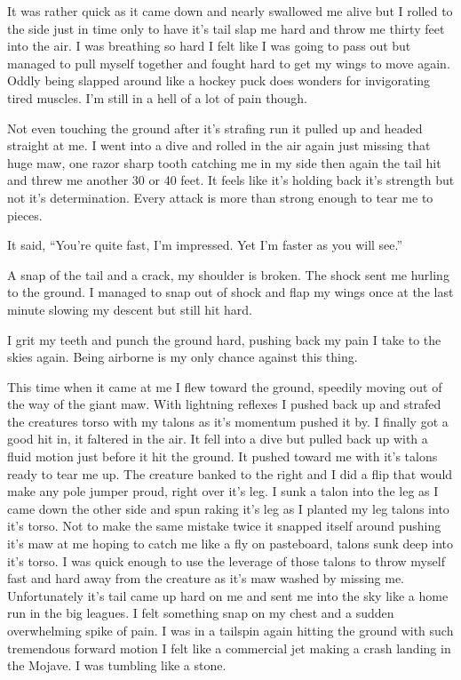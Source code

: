 \parasep{}

It was rather quick as it came down and nearly swallowed me alive but I rolled to the side just in time only to have it's tail slap me hard and throw me thirty feet into the air. I was breathing so hard I felt like I was going to pass out but managed to pull myself together and fought hard to get my wings to move again. Oddly being slapped around like a hockey puck does wonders for invigorating tired muscles. I'm still in a hell of a lot of pain though.

Not even touching the ground after it's strafing run it pulled up and headed straight at me. I went into a dive and rolled in the air again just missing that huge maw, one razor sharp tooth catching me in my side then again the tail hit and threw me another 30 or 40 feet. It feels like it's holding back it's strength but not it's determination. Every attack is more than strong enough to tear me to pieces.

It said, ``You're quite fast, I'm impressed. Yet I'm faster as you will see.''

A snap of the tail and a crack, my shoulder is broken. The shock sent me hurling to the ground. I managed to snap out of shock and flap my wings once at the last minute slowing my descent but still hit hard.

I grit my teeth and punch the ground hard, pushing back my pain I take to the skies again. Being airborne is my only chance against this thing.

This time when it came at me I flew toward the ground, speedily moving out of the way of the giant maw. With lightning reflexes I pushed back up and strafed the creatures torso with my talons as it's momentum pushed it by. I finally got a good hit in, it faltered in the air. It fell into a dive but pulled back up with a fluid motion just before it hit the ground. It pushed toward me with it's talons ready to tear me up. The creature banked to the right and I did a flip that would make any pole jumper proud, right over it's leg. I sunk a talon into the leg as I came down the other side and spun raking it's leg as I planted my leg talons into it's torso. Not to make the same mistake twice it snapped itself around pushing it's maw at me hoping to catch me like a fly on pasteboard, talons sunk deep into it's torso. I was quick enough to use the leverage of those talons to throw myself fast and hard away from the creature as it's maw washed by missing me. Unfortunately it's tail came up hard on me and sent me into the sky like a home run in the big leagues. I felt something snap on my chest and a sudden overwhelming spike of pain. I was in a tailspin again hitting the ground with such tremendous forward motion I felt like a commercial jet making a crash landing in the Mojave. I was tumbling like a stone.

